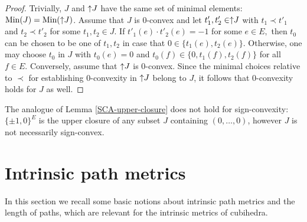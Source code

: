 \documentclass[11pt,a4paper]{amsart}
\theoremstyle{definition}
\numberwithin{equation}{section}
\DeclareMathOperator{\Min}{Min}
\newcommand{\hcovectors}{J}
\begin{document}
\begin{proof} Trivially, $\hcovectors$ and $\uparrow\hspace*{-0.1cm}\hcovectors$ have the same set of minimal elements: $\Min(\hcovectors)=\Min(\uparrow\hspace*{-0.1cm}\hcovectors)$.
Assume that $\hcovectors$ is 0-convex and let $t'_1,t'_2\in \uparrow\hspace*{-0.1cm}\hcovectors$
with $t_1\prec t'_1$ and $t_2\prec t'_2$ for some $t_1,t_2\in \hcovectors.$ If $t'_1(e)\cdot t'_2(e)=-1$ for some $e\in E,$ then $t_0$ can be chosen to be one of
$t_1,t_2$ in case that $0\in \{ t_1(e),t_2(e)\}.$ Otherwise, one may choose $t_0$ in $\hcovectors$ with $t_0(e)=0$ and $t_0(f)\in \{ 0,t_1(f),t_2(f)\}$ for all $f\in E.$
Conversely, assume that $\uparrow\hspace*{-0.1cm}\hcovectors$ is 0-convex. Since the minimal choices relative to $\prec$ for establishing 0-convexity
in $\uparrow\hspace*{-0.1cm}\hcovectors$ belong to $\hcovectors$, it follows that 0-convexity holds for $\hcovectors$ as well.
\end{proof}

The analogue of Lemma \ref{SCA-upper-closure} does not hold for sign-convexity:  $\{ \pm 1,0\}^E$ is the upper closure of any subset $\hcovectors$ containing $(0,\ldots,0)$, however $\hcovectors$ is not necessarily sign-convex.


\section{Intrinsic path metrics}\label{path_intrinsic}
In this section we recall some basic notions about intrinsic path metrics and the length of paths, which are relevant for the intrinsic metrics of cubihedra.
\end{document}
